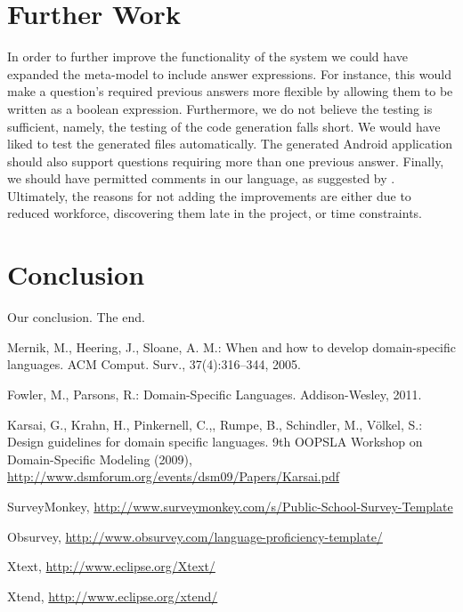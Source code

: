 \documentclass[runningheads]{llncs}
\begin{document}
\section{Further Work}
In order to further improve the functionality of the system we could have expanded the meta-model to include answer expressions. For instance, this would make a question's required previous answers more flexible by allowing them to be written as a boolean expression. Furthermore, we do not believe the testing is sufficient, namely, the testing of the code generation falls short. We would have liked to test the generated files automatically. The generated Android application should also support questions requiring more than one previous answer. Finally, we should have permitted comments in our language, as suggested by \cite{karsai}. Ultimately, the reasons for not adding the improvements are either due to reduced workforce, discovering them late in the project, or time constraints.

\section{Conclusion}
Our conclusion. The end.

\begin{thebibliography}{4}

 Mernik, M., Heering, J., Sloane, A. M.: When and how to develop domain-specific languages. ACM Comput. Surv., 37(4):316–344, 2005.

  Fowler, M., Parsons, R.: Domain-Specific Languages. Addison-Wesley, 2011.

 Karsai, G., Krahn, H., Pinkernell, C.,, Rumpe, B., Schindler, M., Völkel, S.: Design guidelines for domain specific languages. 
9th OOPSLA Workshop on Domain-Specific Modeling (2009), \url{http://www.dsmforum.org/events/dsm09/Papers/Karsai.pdf}

SurveyMonkey, \url{http://www.surveymonkey.com/s/Public-School-Survey-Template}

Obsurvey, \url{http://www.obsurvey.com/language-proficiency-template/}

Xtext, \url{http://www.eclipse.org/Xtext/}

Xtend, \url{http://www.eclipse.org/xtend/}

\end{thebibliography}
\end{document}
